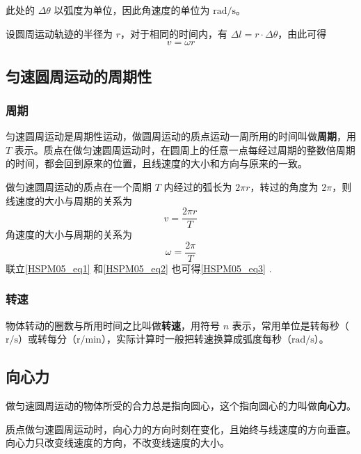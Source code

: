 此处的 $\Delta \theta$ 以弧度为单位，因此角速度的单位为 $\mathrm{rad/s}$。

设圆周运动轨迹的半径为 $r$，对于相同的时间内，有 $\Delta l=r \cdot \Delta \theta$，由此可得
\begin{equation}\label{HSPM05_eq3}
v=\omega r
\end{equation}

\subsection{匀速圆周运动的周期性}

\subsubsection{周期}

匀速圆周运动是周期性运动，做圆周运动的质点运动一周所用的时间叫做\textbf{周期}，用 $T$ 表示。质点在做匀速圆周运动时，在圆周上的任意一点每经过周期的整数倍周期的时间，都会回到原来的位置，且线速度的大小和方向与原来的一致。

做匀速圆周运动的质点在一个周期 $T$ 内经过的弧长为 $2\pi r$，转过的角度为 $2\pi$，则线速度的大小与周期的关系为
\begin{equation}\label{HSPM05_eq1}
v=\frac{2\pi r}{T}
\end{equation}
角速度的大小与周期的关系为
\begin{equation}\label{HSPM05_eq2}
\omega = \frac{2\pi}{T}
\end{equation}
联立\autoref{HSPM05_eq1} 和\autoref{HSPM05_eq2} 也可得\autoref{HSPM05_eq3} .

\subsubsection{转速}

物体转动的圈数与所用时间之比叫做\textbf{转速}，用符号 $n$ 表示，常用单位是转每秒（$\mathrm{r/s}$）或转每分（$\mathrm{r/min}$），实际计算时一般把转速换算成弧度每秒（$\mathrm{rad/s}$）。

\subsection{向心力}

做匀速圆周运动的物体所受的合力总是指向圆心，这个指向圆心的力叫做\textbf{向心力}。

质点做匀速圆周运动时，向心力的方向时刻在变化，且始终与线速度的方向垂直。向心力只改变线速度的方向，不改变线速度的大小。

